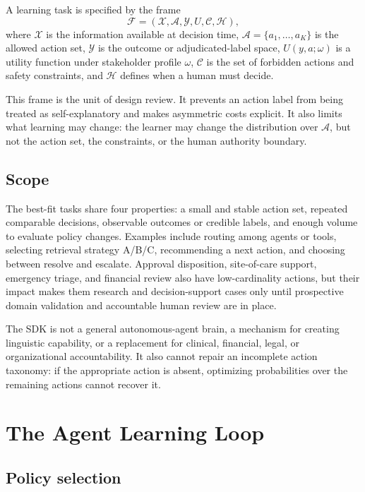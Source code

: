 \documentclass[conference]{IEEEtran}
\begin{document}
A learning task is specified by the frame
\begin{equation}
\mathcal{F} = (\mathcal{X},\mathcal{A},\mathcal{Y},U,\mathcal{C},\mathcal{H}),
\label{eq:frame}
\end{equation}
where $\mathcal{X}$ is the information available at decision time,
$\mathcal{A}=\{a_1,\ldots,a_K\}$ is the allowed action set,
$\mathcal{Y}$ is the outcome or adjudicated-label space,
$U(y,a;\omega)$ is a utility function under stakeholder profile
$\omega$, $\mathcal{C}$ is the set of forbidden actions and safety
constraints, and $\mathcal{H}$ defines when a human must decide.

This frame is the unit of design review. It prevents an action label
from being treated as self-explanatory and makes asymmetric costs
explicit. It also limits what learning may change: the learner may
change the distribution over $\mathcal{A}$, but not the action set,
the constraints, or the human authority boundary.

\subsection{Scope}

The best-fit tasks share four properties: a small and stable action
set, repeated comparable decisions, observable outcomes or credible
labels, and enough volume to evaluate policy changes. Examples
include routing among agents or tools, selecting retrieval strategy
A/B/C, recommending a next action, and choosing between resolve and
escalate. Approval disposition, site-of-care support, emergency
triage, and financial review also have low-cardinality actions, but
their impact makes them research and decision-support cases only
until prospective domain validation and accountable human review are
in place.

The SDK is not a general autonomous-agent brain, a mechanism for
creating linguistic capability, or a replacement for clinical,
financial, legal, or organizational accountability. It also cannot
repair an incomplete action taxonomy: if the appropriate action is
absent, optimizing probabilities over the remaining actions cannot
recover it.

\section{The Agent Learning Loop}
\label{sec:loop}

\subsection{Policy selection}
\end{document}
